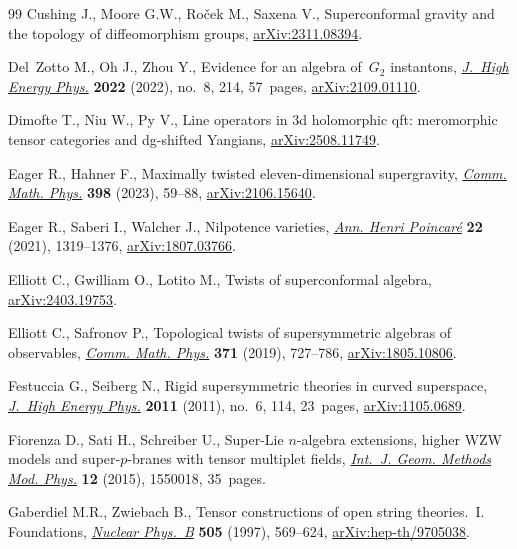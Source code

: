 \documentclass[pdftex]{sigma}
\numberwithin{equation}{section}
\theoremstyle{definition}
\begin{document}
\begin{thebibliography}{99}
Cushing J., Moore G.W., Ro{\v{c}}ek M., Saxena V., Superconformal gravity and
 the topology of diffeomorphism groups,
 \href{http://arxiv.org/abs/2311.08394}{arXiv:2311.08394}.

Del~Zotto M., Oh J., Zhou Y., Evidence for an algebra of~{$G_2$} instantons,
 \href{https://doi.org/10.1007/jhep08(2022)214}{\textit{J.~High Energy Phys.}}
 \textbf{2022} (2022), no.~8, 214, 57~pages,
 \href{http://arxiv.org/abs/2109.01110}{arXiv:2109.01110}.

Dimofte T., Niu W., Py V., Line operators in 3d holomorphic qft: meromorphic
 tensor categories and dg-shifted {Y}angians,
 \href{http://arxiv.org/abs/2508.11749}{arXiv:2508.11749}.

Eager R., Hahner F., Maximally twisted eleven-dimensional supergravity,
 \href{https://doi.org/10.1007/s00220-022-04516-5}{\textit{Comm. Math. Phys.}}
 \textbf{398} (2023), 59--88,
 \href{http://arxiv.org/abs/2106.15640}{arXiv:2106.15640}.

Eager R., Saberi I., Walcher J., Nilpotence varieties,
 \href{https://doi.org/10.1007/s00023-020-01007-y}{\textit{Ann. Henri
 Poincar\'e}} \textbf{22} (2021), 1319--1376,
 \href{http://arxiv.org/abs/1807.03766}{arXiv:1807.03766}.

Elliott C., Gwilliam O., Lotito M., Twists of superconformal algebra,
 \href{http://arxiv.org/abs/2403.19753}{arXiv:2403.19753}.

Elliott C., Safronov P., Topological twists of supersymmetric algebras of
 observables, \href{https://doi.org/10.1007/s00220-019-03393-9}{\textit{Comm.
 Math. Phys.}} \textbf{371} (2019), 727--786,
 \href{http://arxiv.org/abs/1805.10806}{arXiv:1805.10806}.

Festuccia G., Seiberg N., Rigid supersymmetric theories in curved superspace,
 \href{https://doi.org/10.1007/JHEP06(2011)114}{\textit{J.~High Energy Phys.}}
 \textbf{2011} (2011), no.~6, 114, 23~pages,
 \href{http://arxiv.org/abs/1105.0689}{arXiv:1105.0689}.

Fiorenza D., Sati H., Schreiber U., Super-{L}ie {$n$}-algebra extensions,
 higher {WZW} models and super-{$p$}-branes with tensor multiplet fields,
 \href{https://doi.org/10.1142/S0219887815500188}{\textit{Int.~J. Geom.
 Methods Mod. Phys.}} \textbf{12} (2015), 1550018, 35~pages.

Gaberdiel M.R., Zwiebach B., Tensor constructions of open string theories.~{I}.
 {F}oundations,
 \href{https://doi.org/10.1016/S0550-3213(97)00580-4}{\textit{Nuclear
 Phys.~B}} \textbf{505} (1997), 569--624,
 \href{http://arxiv.org/abs/hep-th/9705038}{arXiv:hep-th/9705038}.


\end{thebibliography}
\end{document}
